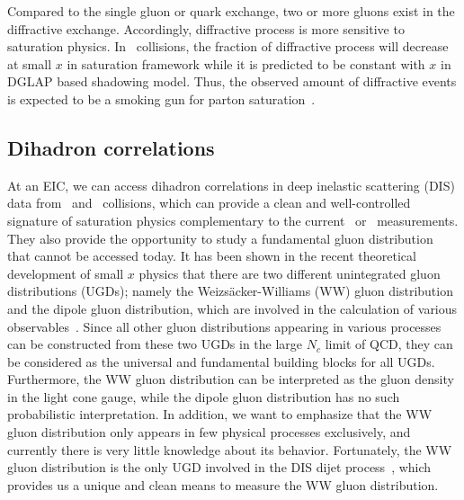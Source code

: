 Compared to the single gluon or quark exchange, two or more gluons exist in the
diffractive exchange. Accordingly, diffractive process is more sensitive to
saturation physics. In \eA\ collisions, the fraction of diffractive process will
decrease at small $x$ in saturation framework while it is predicted to be constant
with $x$ in DGLAP based shadowing model. Thus, the observed amount of
diffractive events is expected to be a smoking gun for parton
saturation~\cite{Kowalski:2008sa}.

\subsection{Dihadron correlations}  \label{subsec:dihadron_preintro}
At an EIC, we can access dihadron correlations in deep inelastic scattering
(DIS) data from \eA\ and \ep\ collisions, which can provide a clean and
well-controlled signature of saturation physics complementary to the current \dA\
or \pA\ measurements. They also provide the opportunity to study a fundamental
gluon distribution that cannot be accessed today. It has been shown in the
recent theoretical development of small $x$ physics that there are two different
unintegrated gluon distributions (UGDs); namely the Weizs\"{a}cker-Williams (WW)
gluon distribution and the dipole gluon distribution, which are involved in the
calculation of various observables~\cite{Dominguez:2010xd}. Since all other
gluon distributions appearing in various processes can be constructed from these
two UGDs in the large $N_c$ limit of QCD, they can be considered as the
universal and fundamental building blocks for all UGDs. Furthermore, the WW
gluon distribution can be interpreted as the gluon density in the light cone
gauge, while the dipole gluon distribution has no such probabilistic
interpretation. In addition, we want to emphasize that the WW gluon distribution
only appears in few physical processes exclusively, and currently there is very
little knowledge about its behavior. Fortunately, the WW gluon distribution is
the only UGD involved in the DIS dijet process~\cite{Dominguez:2011wm}, which
provides us a unique and clean means to measure the WW gluon distribution.



